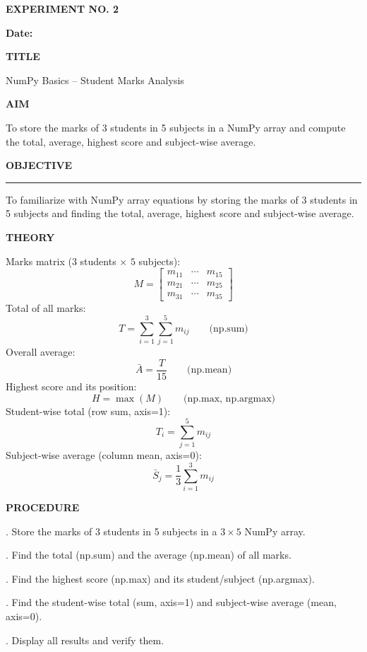 \documentclass[11pt,twoside]{article}
\newcommand{\expheading}[1]{{\fontsize{14}{17}\selectfont\textbf{#1}\par}}
\newcommand{\fullrule}{\noindent\rule{\textwidth}{0.6pt}\par}
\begin{document}
\sloppy

{\setlength{\parskip}{1pt}\setlength{\abovedisplayskip}{2pt}\setlength{\belowdisplayskip}{2pt}
\begin{center}
\expheading{EXPERIMENT NO. 2}
\end{center}
\vspace{2pt}

\noindent\textbf{Date:} \underline{\hspace{2.6cm}}\par
\vspace{6pt}

\expheading{TITLE}
\vspace{4pt}
\noindent NumPy Basics -- Student Marks Analysis\par
\vspace{4pt}

\expheading{AIM}
\vspace{4pt}
\noindent To store the marks of 3 students in 5 subjects in a NumPy array and compute the total, average, highest score and subject-wise average. \par
\vspace{4pt}

\expheading{OBJECTIVE}
\vspace{2pt}
\fullrule
\vspace{4pt}
\noindent To familiarize with NumPy array equations by storing the marks of 3 students in 5 subjects and finding the total, average, highest score and subject-wise average. \par
\vspace{4pt}

\expheading{THEORY}
\vspace{4pt}
Marks matrix ($3$ students $\times$ $5$ subjects):
\[M=\begin{bmatrix}m_{11} & \cdots & m_{15}\\m_{21} & \cdots & m_{25}\\m_{31} & \cdots & m_{35}\end{bmatrix}\]
Total of all marks:
\[T=\sum_{i=1}^{3}\sum_{j=1}^{5}m_{ij}\qquad\text{(np.sum)}\]
Overall average:
\[\bar{A}=\frac{T}{15}\qquad\text{(np.mean)}\]
Highest score and its position:
\[H=\max(M)\qquad\text{(np.max, np.argmax)}\]
Student-wise total (row sum, axis=1):
\[T_i=\sum_{j=1}^{5}m_{ij}\]
Subject-wise average (column mean, axis=0):
\[\bar{S}_j=\frac{1}{3}\sum_{i=1}^{3}m_{ij}\]
\vspace{4pt}

\expheading{PROCEDURE}
\vspace{4pt}
. Store the marks of 3 students in 5 subjects in a $3\times5$ NumPy array.\par
{}. Find the total (np.sum) and the average (np.mean) of all marks.\par
{}. Find the highest score (np.max) and its student/subject (np.argmax).\par
{}. Find the student-wise total (sum, axis=1) and subject-wise average (mean, axis=0).\par
{}. Display all results and verify them. \par
\vspace{4pt}

}
\end{document}

